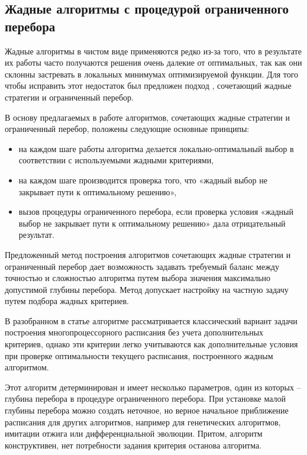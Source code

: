 \subsection{Жадные алгоритмы с процедурой ограниченного перебора}

Жадные алгоритмы в чистом  виде применяются редко из-за того, что в результате их работы часто получаются решения очень далекие от оптимальных, так как они склонны застревать в локальных минимумах оптимизируемой функции. Для того чтобы исправить этот недостаток был предложен подход \cite{Kostenko_2017}, сочетающий жадные стратегии и ограниченный перебор.

В основу предлагаемых в работе алгоритмов, сочетающих жадные стратегии и ограниченный перебор, положены следующие основные принципы:
\begin{itemize}
    \item на каждом шаге работы алгоритма делается локально-оптимальный выбор в соответствии с используемыми жадными критериями,
    \item на каждом шаге производится проверка того, что «жадный выбор не закрывает пути к оптимальному решению»,
    \item вызов процедуры ограниченного перебора, если проверка условия «жадный выбор не закрывает пути к оптимальному решению» дала отрицательный результат.
\end{itemize}
Предложенный метод построения алгоритмов сочетающих жадные стратегии и ограниченный перебор дает возможность задавать требуемый баланс между точностью и сложностью алгоритма путем выбора значения максимально допустимой глубины перебора. Метод допускает настройку на частную задачу путем подбора жадных критериев.

В разобранном в статье \cite{Kostenko_2017} алгоритме рассматривается классический вариант задачи построения многопроцессорного расписания без учета дополнительных критериев, однако эти критерии легко учитываются как дополнительные условия при проверке оптимальности текущего расписания, построенного жадным алгоритмом.

Этот алгоритм детерминирован и имеет несколько параметров, один из которых – глубина перебора в процедуре ограниченного перебора. При установке малой глубины перебора можно создать неточное, но верное начальное приближение расписания для других алгоритмов, например для генетических алгоритмов, имитации отжига или дифференциальной эволюции. Притом, алгоритм конструктивен, нет потребности задания критерия останова алгоритма.

